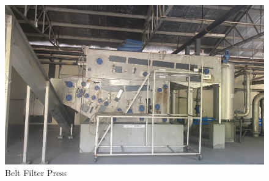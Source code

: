 \begin{figure}[H]
\centering
\includegraphics[width=0.98\linewidth]{material_and_methodology/Belt press.jpg}
\caption{Belt Filter Press}
\label{fig:Belt_filter_press}
\end{figure}